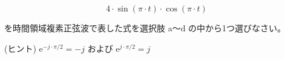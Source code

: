 \[
4 \cdot \sin(\pi \cdot t) \cdot \cos(\pi \cdot t)
\]

\bigskip
\noindent を時間領域複素正弦波で表した式を選択肢 a〜d の中から1つ選びなさい。

\noindent (ヒント) $\textrm{e}^{-j \cdot \pi/2} = -j$ および $\textrm{e}^{j \cdot \pi/2} = j$
